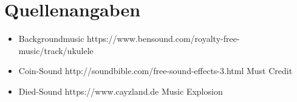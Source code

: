 \section{Quellenangaben}
\begin{itemize}
    \item Backgroundmusic \linebreak
    https://www.bensound.com/royalty-free-music/track/ukulele
    \item Coin-Sound \linebreak
    http://soundbible.com/free-sound-effects-3.html Must Credit
    \item Died-Sound \linebreak
	https://www.cayzland.de Music Explosion
\end{itemize}
























